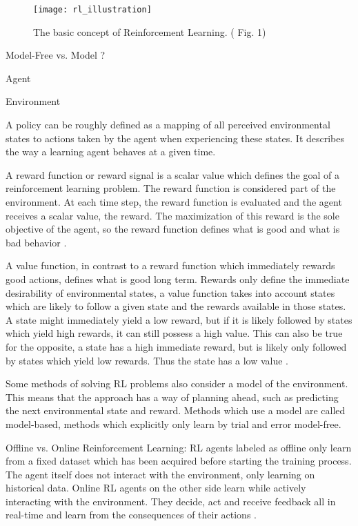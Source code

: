 \parencite{weng2018bandit}
\parencite{sutton2018reinforcement}

\begin{figure}
	\centerline{\texttt{[image: rl\_illustration]}}
	\caption{The basic concept of Reinforcement Learning. (\cite{weng2018bandit} Fig. 1)}
	\label{RL Illustration}
\end{figure}

Model-Free vs. Model ?

Agent

Environment

A policy can be roughly defined as a mapping of all perceived environmental states to actions taken by the agent when experiencing these states.
It describes the way a learning agent behaves at a given time\parencite{sutton2018reinforcement}.

A reward function or reward signal is a scalar value which defines the goal of a reinforcement learning problem.
The reward function is considered part of the environment.
At each time step, the reward function is evaluated and the agent receives a scalar value, the reward.
The maximization of this reward is the sole objective of the agent, so the reward function defines what is good and what is bad behavior \parencite{sutton2018reinforcement}.

A value function, in contrast to a reward function which immediately rewards good actions, defines what is good long term. 
Rewards only define the immediate desirability of environmental states, a value function takes into account states which are likely to follow a given state and the rewards available in those states.
A state might immediately yield a low reward, but if it is likely followed by states which yield high rewards, it can still possess a high value.
This can also be true for the opposite, a state has a high immediate reward, but is likely only followed by states which yield low rewards. Thus the state has a low value \parencite{sutton2018reinforcement}.

Some methods of solving RL problems also consider a model of the environment. This means that the approach has a way of planning ahead, such as predicting the next environmental state and reward.
Methods which use a model are called model-based, methods which explicitly only learn by trial and error model-free\parencite{sutton2018reinforcement}.

Offline vs. Online Reinforcement Learning: 
RL agents labeled as offline only learn from a fixed dataset which has been acquired before starting the training process.
The agent itself does not interact with the environment, only learning on historical data.
Online RL agents on the other side learn while actively interacting with the environment.
They decide, act and receive feedback all in real-time and learn from the consequences of their actions \parencite{schrittwieser2021online}.



